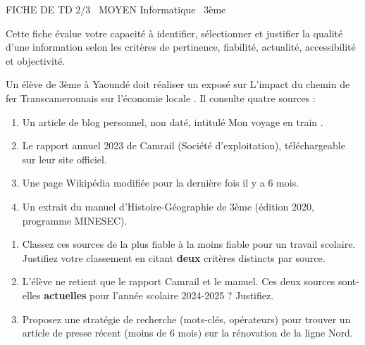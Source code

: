 \documentclass[11pt]{article}
\begin{document}
\begin{tcolorbox}[enhanced,colback=popink,colframe=popink,arc=10pt,boxrule=0pt,left=12pt,right=12pt,top=9pt,bottom=9pt]
{\color{white}\popxbold\small FICHE DE TD 2/3 \textbullet\ MOYEN \hfill Informatique \textbullet\ 3ème\par}
\end{tcolorbox}
\vspace{4pt}
Cette fiche évalue votre capacité à identifier, sélectionner et justifier la qualité d'une information selon les critères de pertinence, fiabilité, actualité, accessibilité et objectivité.

\begin{exercice}
Un élève de 3ème à Yaoundé doit réaliser un exposé sur \og L'impact du chemin de fer Transcamerounais sur l'économie locale \fg. Il consulte quatre sources :
\begin{enumerate}
    \item Un article de blog personnel, non daté, intitulé \og Mon voyage en train \fg.
    \item Le rapport annuel 2023 de Camrail (Société d'exploitation), téléchargeable sur leur site officiel.
    \item Une page Wikipédia modifiée pour la dernière fois il y a 6 mois.
    \item Un extrait du manuel d'Histoire-Géographie de 3ème (édition 2020, programme MINESEC).
\end{enumerate}
\begin{enumerate}
    \item Classez ces sources de la plus fiable à la moins fiable pour un travail scolaire. Justifiez votre classement en citant \textbf{deux} critères distincts par source.
    \item L'élève ne retient que le rapport Camrail et le manuel. Ces deux sources sont-elles \textbf{actuelles} pour l'année scolaire 2024-2025 ? Justifiez.
    \item Proposez une stratégie de recherche (mots-clés, opérateurs) pour trouver un article de presse récent (moins de 6 mois) sur la rénovation de la ligne Nord.
\end{enumerate}
\end{exercice}
\end{document}
